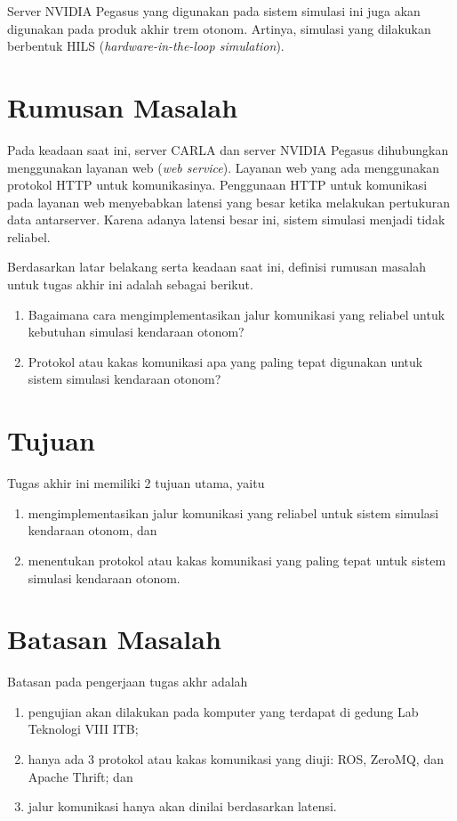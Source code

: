 Server NVIDIA Pegasus yang digunakan pada sistem simulasi ini juga akan
digunakan pada produk akhir trem otonom. Artinya, simulasi yang dilakukan
berbentuk HILS (\textit{hardware-in-the-loop simulation}).

\section{Rumusan Masalah}

Pada keadaan saat ini, server CARLA dan server NVIDIA Pegasus dihubungkan
menggunakan layanan web (\textit{web service}). Layanan web yang ada menggunakan
protokol HTTP untuk komunikasinya. Penggunaan HTTP untuk komunikasi pada layanan
web menyebabkan latensi yang besar ketika melakukan pertukuran data
antarserver. Karena adanya latensi besar ini, sistem simulasi menjadi tidak reliabel.

Berdasarkan latar belakang serta keadaan saat ini, definisi rumusan masalah
untuk tugas akhir ini adalah sebagai berikut.
\begin{enumerate}
	\item Bagaimana cara mengimplementasikan jalur komunikasi yang reliabel
	      untuk kebutuhan simulasi kendaraan otonom?
	\item Protokol atau kakas komunikasi apa yang paling tepat digunakan untuk
	      sistem simulasi kendaraan otonom?
\end{enumerate}

\section{Tujuan}

Tugas akhir ini memiliki 2 tujuan utama, yaitu
\begin{enumerate}
	\item mengimplementasikan jalur komunikasi yang reliabel untuk sistem
	      simulasi kendaraan otonom, dan
	\item menentukan protokol atau kakas komunikasi yang paling tepat untuk
	      sistem simulasi kendaraan otonom.
\end{enumerate}

\section{Batasan Masalah}

Batasan pada pengerjaan tugas akhr adalah

\begin{enumerate}
	\item pengujian akan dilakukan pada komputer yang terdapat di gedung Lab
	      Tek\-no\-lo\-gi VIII ITB;
	\item hanya ada 3 protokol atau kakas komunikasi yang diuji: ROS, ZeroMQ,
	      dan Apache Thrift; dan
	\item jalur komunikasi hanya akan dinilai berdasarkan latensi.
\end{enumerate}


